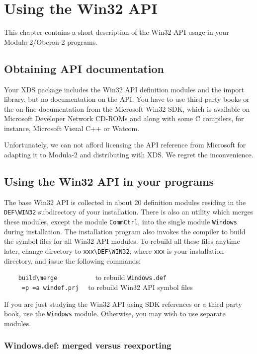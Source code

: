 \chapter{Using the Win32 API}
\label{win32api}

This chapter contains a short description of the Win32 API usage
in your Modula-2/Oberon-2 programs.

\section{Obtaining API documentation}

Your XDS package includes the Win32 API definition modules and the import
library, but no documentation on the API. You have to use
third-party books or the on-line documentation from the
Microsoft Win32 SDK, which is available on Microsoft
Developer Network CD-ROMs and along with some C compilers,
for instance, Microsoft Visual C++ or Watcom.

Unfortunately, we can not afford licensing the API
reference from Microsoft for adapting it to Modula-2
and distributing with XDS. We regret the inconvenience.

\section{Using the Win32 API in your programs}

The base Win32 API is collected in about 20 definition modules
residing in the \verb'DEF\WIN32' subdirectory of your \XDS{} installation.
There is also an utility which merges these modules, except the
module \verb'CommCtrl', into the single module \verb'Windows'
during installation. The installation program
also invokes the compiler to build the symbol files for all Win32 API modules.
To rebuild all these files anytime later,
change directory to \verb'xxx\DEF\WIN32', where \verb'xxx' is your
\XDS{} installation directory, and issue the following
commands:

\verb'    build\merge          ' to rebuild \verb'Windows.def' \\
\verb'    '{\tt \XC{}}\verb' =p =a windef.prj  ' to rebuild Win32 API symbol files

If you are just studying the Win32 API using SDK references or a
third party book, use the \verb'Windows' module.
Otherwise, you may wish to use separate modules.

\subsection{Windows.def: merged versus reexporting}

